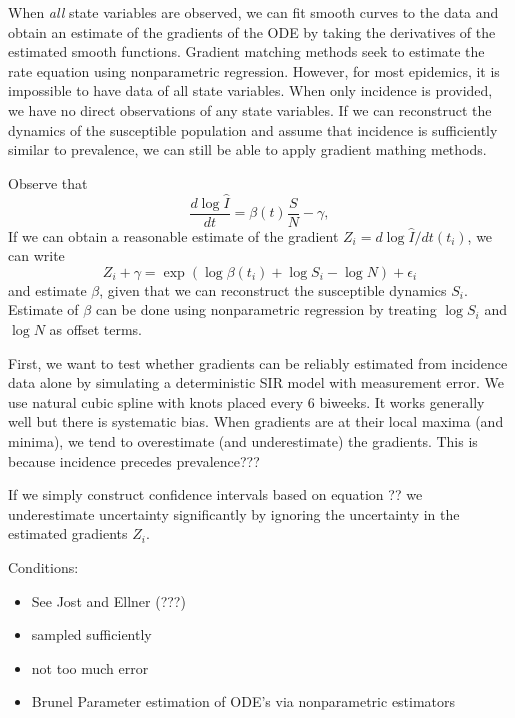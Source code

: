 \documentclass{article}
\begin{document}
When \emph{all} state variables are observed, we can fit smooth curves to the data and obtain an estimate of the gradients of the ODE by taking the derivatives of the estimated smooth functions.
Gradient matching methods seek to estimate the rate equation using nonparametric regression.
However, for most epidemics, it is impossible to have data of all state variables.
When only incidence is provided, we have no direct observations of any state variables. 
If we can reconstruct the dynamics of the susceptible population and assume that incidence is sufficiently similar to prevalence, we can still be able to apply gradient mathing methods.

Observe that
\begin{equation}
\frac{d \log\hat{I}}{dt} = \beta(t) \frac{S}{N} - \gamma,
\end{equation}
If we can obtain a reasonable estimate of the gradient $Z_i = d \log \hat{I}/dt (t_i)$, we can write
\begin{equation}
Z_i + \gamma = \exp \left(\log \beta (t_i) + \log S_i - \log N \right)  + \epsilon_i
\end{equation}
and estimate $\beta$, given that we can reconstruct the susceptible dynamics $S_i$.
Estimate of $\beta$ can be done using nonparametric regression by treating $\log S_i$ and $\log N$ as offset terms.

First, we want to test whether gradients can be reliably estimated from incidence data alone by simulating a deterministic SIR model with measurement error.
We use natural cubic spline with knots placed every 6 biweeks.
It works generally well but there is systematic bias.
When gradients are at their local maxima (and minima), we tend to overestimate (and underestimate) the gradients.
This is because incidence precedes prevalence???

If we simply construct confidence intervals based on equation ?? we underestimate uncertainty significantly by ignoring the uncertainty in the estimated gradients $Z_i$.



Conditions:
\begin{itemize}
	\item See Jost and Ellner (???)
	\item sampled sufficiently
	\item not too much error
	\item Brunel Parameter estimation of ODE’s via nonparametric estimators
\end{itemize}
\end{document}
